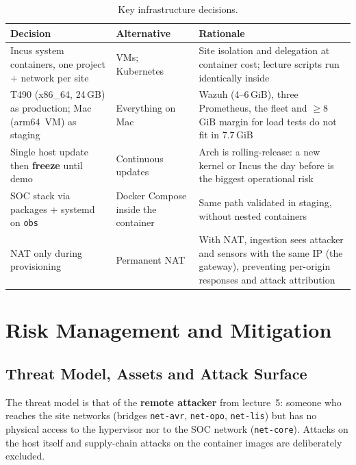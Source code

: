 \documentclass[11pt,a4paper]{article}
\begin{document}
\begin{table}[H]
  \centering
  \caption{Key infrastructure decisions.}
  \label{tab:decisions}
  \begin{tabular}{@{}p{4cm}p{3cm}p{6.5cm}@{}}
    \toprule
    \textbf{Decision} & \textbf{Alternative} & \textbf{Rationale} \\
    \midrule
    Incus system containers, one project + network per site &
      VMs; Kubernetes &
      Site isolation and delegation at container cost; lecture scripts run identically inside \\
    T490 (x86\_64, 24\,GB) as production; Mac (arm64~VM) as staging &
      Everything on Mac &
      Wazuh (4--6\,GiB), three Prometheus, the fleet and $\geq$8\,GiB margin for load tests
      do not fit in 7.7\,GiB \\
    Single host update then \textbf{freeze} until demo &
      Continuous updates &
      Arch is rolling-release: a new kernel or Incus the day before is the biggest
      operational risk \\
    SOC stack via packages + systemd on \texttt{obs} &
      Docker Compose inside the container &
      Same path validated in staging, without nested containers \\
    NAT only during provisioning &
      Permanent NAT &
      With NAT, ingestion sees attacker and sensors with the same IP (the gateway), preventing
      per-origin responses and attack attribution \\
    \bottomrule
  \end{tabular}
\end{table}


\section{Risk Management and Mitigation}
\label{sec:risk}

\subsection{Threat Model, Assets and Attack Surface}

The threat model is that of the \textbf{remote attacker} from lecture~5: someone who reaches
the site networks (bridges \texttt{net-avr}, \texttt{net-opo}, \texttt{net-lis}) but has no
physical access to the hypervisor nor to the SOC network (\texttt{net-core}). Attacks on the
host itself and supply-chain attacks on the container images are deliberately excluded.
\end{document}
